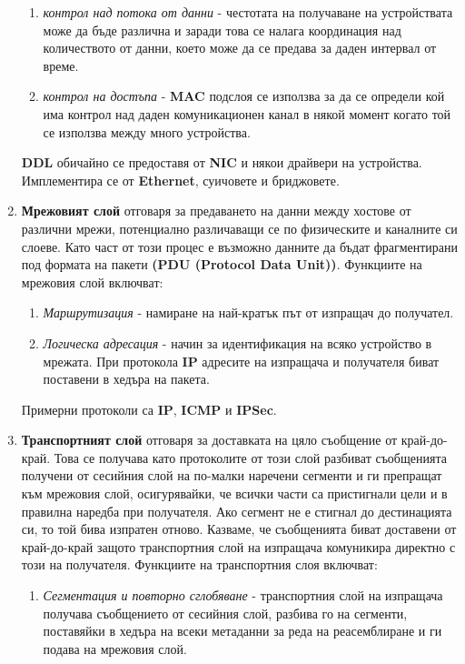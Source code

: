 \documentclass[fleqn,12pt]{article}
\begin{document}
\begin{flushleft}
\begin{enumerate}
\begin{enumerate}
        \item \textit{контрол над потока от данни} - честотата на получаване на устройствата може да бъде различна и заради това се налага координация над количеството от данни, което 
        може да се предава за даден интервал от време.
        \item \textit{контрол на достъпа} - \textbf{MAC} подслоя се използва за да се определи кой има контрол над даден комуникационен канал в някой момент когато той се използва между много устройства.
    \end{enumerate}
    \textbf{DDL} обичайно се предоставя от \textbf{NIC} и някои драйвери на устройства. Имплементира се от \textbf{Ethernet}, суичовете и бриджовете.
    \item \textbf{Мрежовият слой} отговаря за предаването на данни между хостове от различни мрежи, потенциално различаващи се по физическите и каналните си слоеве.
    Като част от този процес е възможно данните да бъдат фрагментирани под формата на пакети \textbf{(PDU (Protocol Data Unit))}.
    Функциите на мрежовия слой включват:
    \begin{enumerate}
        \item \textit{Маршрутизация} - намиране на най-кратък път от изпращач до получател.
        \item \textit{Логическа адресация} - начин за идентификация на всяко устройство в мрежата. При протокола \textbf{IP} адресите на изпращача и получателя биват поставени в хедъра на пакета.
    \end{enumerate}
    Примерни протоколи са \textbf{IP}, \textbf{ICMP} и \textbf{IPSec}.
    \item \textbf{Транспортният слой} отговаря за доставката на цяло съобщение от край-до-край.
    Това се получава като протоколите от този слой разбиват съобщенията получени от сесийния слой на по-малки наречени сегменти и ги препращат към мрежовия слой,
    осигурявайки, че всички части са пристигнали цели и в правилна наредба при получателя. Ако сегмент не е стигнал до дестинацията си, то той бива изпратен отново.
    Казваме, че съобщенията биват доставени от край-до-край защото транспортния слой на изпращача комуникира директно с този на получателя.
    Функциите на транспортния слоя включват:
    \begin{enumerate}
        \item \textit{Сегментация и повторно сглобяване} - транспортния слой на изпращача получава съобщението от сесийния слой, разбива го на сегменти, поставяйки в хедъра на всеки метаданни за реда на реасемблиране и ги подава на мрежовия слой.

\end{enumerate}
\end{enumerate}
\end{flushleft}
\end{document}
